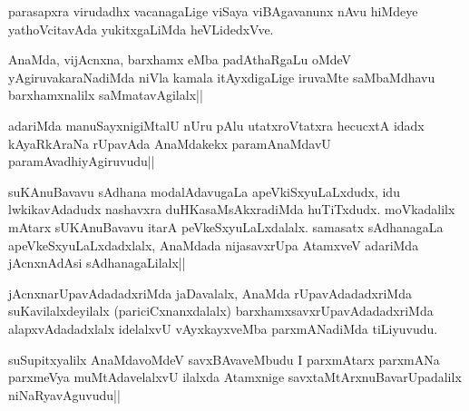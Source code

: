 \begin{artha}
parasapxra virudadhx vacanagaLige viSaya viBAgavanunx nAvu hiMdeye yathoVcitavAda yukitxgaLiMda heVLidedxVve.
\end{artha}

\begin{artha}%
AnaMda, vijAcnxna, barxhamx eMba padAthaRgaLu oMdeV yAgiruvakaraNadiMda niVla kamala itAyxdigaLige iruvaMte saMbaMdhavu barxhamxnalilx saMmatavAgilalx||
\end{artha}

\begin{artha}
adariMda manuSayxnigiMtalU nUru pAlu utatxroVtatxra hecucxtA idadx kAyaRkAraNa rUpavAda AnaMdakekx paramAnaMdavU paramAvadhiyAgiruvudu||
\end{artha}


\begin{artha}
suKAnuBavavu sAdhana modalAdavugaLa apeVkiSxyuLaLxdudx, idu lwkikavAdadudx nashavxra duHKasaMsAkxradiMda huTiTxdudx. moVkadalilx mAtarx sUKAnuBavavu itarA peVkeSxyuLaLxdalalx. samasatx sAdhanagaLa apeVkeSxyuLaLxdadxlalx, AnaMdada nijasavxrUpa AtamxveV adariMda jAcnxnAdAsi sAdhanagaLilalx||
\end{artha}

\begin{artha}%
jAcnxnarUpavAdadadxriMda jaDavalalx, AnaMda rUpavAdadadxriMda suKavilalxdeyilalx (pariciCxnanxdalalx) barxhamxsavxrUpavAdadadxriMda alapxvAdadadxlalx idelalxvU vAyxkayxveMba parxmANadiMda tiLiyuvudu.
\end{artha}

\begin{artha}
suSupitxyalilx AnaMdavoMdeV savxBAvaveMbudu I parxmAtarx parxmANa parxmeVya muMtAdavelalxvU ilalxda Atamxnige savxtaMtArxnuBavarUpadalilx niNaRyavAguvudu||
\end{artha}


